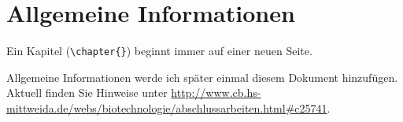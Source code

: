 \documentclass[nomenclature, norefpage, oneside, glossary, hypertext,multiauthor]{hsmw-class}
\begin{document}
\chapter{Allgemeine Informationen}
Ein Kapitel (\verb+\chapter{}+) beginnt immer auf einer neuen Seite.

Allgemeine Informationen werde ich später einmal diesem Dokument hinzufügen. Aktuell finden Sie Hinweise unter \url{http://www.cb.hs-mittweida.de/webs/biotechnologie/abschlussarbeiten.html#c25741}.



\Anhang



\printbibliography[filter=original, title={Originalarbeiten}]
\printbibliography[type=online, title={Webseiten}]
\end{document}
